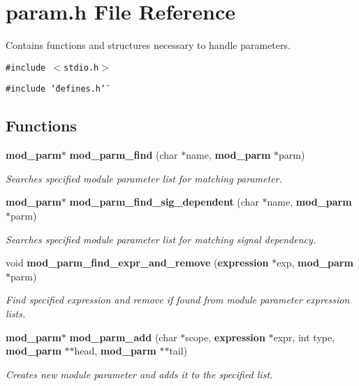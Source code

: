 \section{param.h File Reference}
\label{param_8h}
Contains functions and structures necessary to handle parameters. 


{\tt \#include $<$stdio.h$>$}\par
{\tt \#include \char`\"{}defines.h\char`\"{}}\par
\subsection*{Functions}
\begin{CompactItemize}
\item 
{\bf mod\_\-parm}$\ast$ {\bf mod\_\-parm\_\-find} (char $\ast$name, {\bf mod\_\-parm} $\ast$parm)
\begin{CompactList}\small\item\em Searches specified module parameter list for matching parameter.\item\end{CompactList}\item 
{\bf mod\_\-parm}$\ast$ {\bf mod\_\-parm\_\-find\_\-sig\_\-dependent} (char $\ast$name, {\bf mod\_\-parm} $\ast$parm)
\begin{CompactList}\small\item\em Searches specified module parameter list for matching signal dependency.\item\end{CompactList}\item 
void {\bf mod\_\-parm\_\-find\_\-expr\_\-and\_\-remove} ({\bf expression} $\ast$exp, {\bf mod\_\-parm} $\ast$parm)
\begin{CompactList}\small\item\em Find specified expression and remove if found from module parameter expression lists.\item\end{CompactList}\item 
{\bf mod\_\-parm}$\ast$ {\bf mod\_\-parm\_\-add} (char $\ast$scope, {\bf expression} $\ast$expr, int type, {\bf mod\_\-parm} $\ast$$\ast$head, {\bf mod\_\-parm} $\ast$$\ast$tail)
\begin{CompactList}\small\item\em Creates new module parameter and adds it to the specified list.\item\end{CompactList}\item 

\end{CompactItemize}
